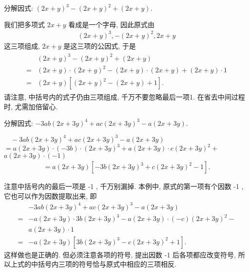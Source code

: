 \begin{example}[切勿漏 1]
	分解因式: $(2 x+y)^{3}-(2 x+y)^{2}+(2 x+y)$.
\end{example}
\begin{solution}
	我们把多项式 $2 x+y$ 看成是一个字母, 因此原式由
	\begin{align*}
		(2 x+y)^{3},-(2 x+y)^{2}, 2 x+y
	\end{align*}
	这三项组成,  $2 x+y$ 是这三项的公因式, 于是
	\begin{align*}
		\begin{aligned}
			  & (2 x+y)^{3}-(2 x+y)^{2}+(2 x+y)                               \\
			= & (2 x+y) \cdot(2 x+y)^{2}-(2 x+y) \cdot(2 x+y)+(2 x+y) \cdot 1 \\
			= & (2 x+y)\left[(2 x+y)^{2}-(2 x+y)+1\right] .
		\end{aligned}
	\end{align*}
	请注意, 中括号内的式子仍由三项组成, 千万不要忽略最后一项1. 在省去中间过程时, 尤需加倍留心.
\end{solution}

\begin{example}[注意符号]\label{ex:提公因式-例4-注意符号}
	分解因式: $-3 a b(2 x+3 y)^{4}+a c(2 x+3 y)^{3}-a(2 x+3 y)$.
\end{example}
\begin{solution}
	$\quad-3 a b(2 x+3 y)^{4}+a c(2 x+3 y)^{3}-a(2 x+3 y)$\\
	$=a(2 x+3 y) \cdot(-3 b) \cdot(2 x+3 y)^{3}+a(2 x+3 y) \cdot c(2 x+3 y)^{2}+$ $a(2 x+3 y) \cdot(-1)$
	\begin{align*}
		=a(2 x+3 y)\left[-3 b(2 x+3 y)^{3}+c(2 x+3 y)^{2}-1\right] .
	\end{align*}
\end{solution}
\begin{note}
	注意中括号内的最后一项是 -1 , 千万别漏掉. 本例中, 原式的第一项有个因数 -1 , 它也可以作为因数提取出来, 即
	\begin{align*}
		  & -3 a b(2 x+3 y)^{4}+a c(2 x+3 y)^{3}-a(2 x+3 y)                       \\
		= & -a(2 x+3 y) \cdot 3 b(2 x+3 y)^{3}-a(2 x+3 y) \cdot(-c)(2 x+3 y)^{2}- \\
		  & a(2 x+3 y) \cdot 1                                                    \\
		= & -a(2 x+3 y)\left[3 b(2 x+3 y)^{3}-c(2 x+3 y)^{2}+1\right] .
	\end{align*}
	这样做也是正确的. 但必须注意各项的符号, 提出因数 -1 后各项都应改变符号, 所以上式的中括号内三项的符号恰与原式中相应的三项相反.
\end{note}

